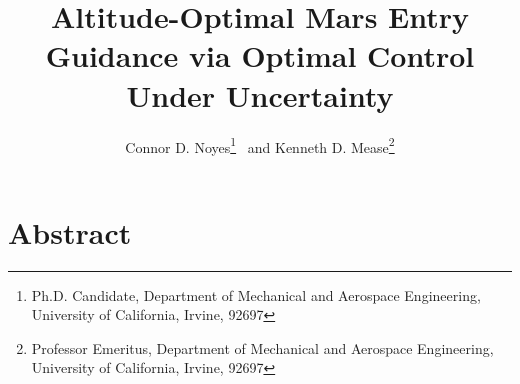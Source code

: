 \documentclass[journal ]{new-aiaa}
\title{Altitude-Optimal Mars Entry Guidance via Optimal Control Under Uncertainty}
\begin{document}
\author{Connor D. Noyes\thanks{Ph.D. Candidate, Department of Mechanical and Aerospace Engineering, University of California, Irvine, 92697} \ and Kenneth D. Mease\thanks{Professor Emeritus, Department of Mechanical and Aerospace Engineering, University of California, Irvine, 92697}}
\maketitle




\section*{Abstract}
\end{document}
